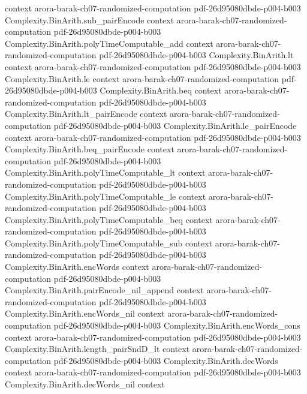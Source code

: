 \begin{theorem}
  {context}
  {arora-barak-ch07-randomized-computation}
  {pdf-26d95080dbde-p004-b003}
\proofstep
  {Complexity.BinArith.sub_pairEncode}
  {context}
  {arora-barak-ch07-randomized-computation}
  {pdf-26d95080dbde-p004-b003}
\proofstep
  {Complexity.BinArith.polyTimeComputable_add}
  {context}
  {arora-barak-ch07-randomized-computation}
  {pdf-26d95080dbde-p004-b003}
\proofstep
  {Complexity.BinArith.lt}
  {context}
  {arora-barak-ch07-randomized-computation}
  {pdf-26d95080dbde-p004-b003}
\proofstep
  {Complexity.BinArith.le}
  {context}
  {arora-barak-ch07-randomized-computation}
  {pdf-26d95080dbde-p004-b003}
\proofstep
  {Complexity.BinArith.beq}
  {context}
  {arora-barak-ch07-randomized-computation}
  {pdf-26d95080dbde-p004-b003}
\proofstep
  {Complexity.BinArith.lt_pairEncode}
  {context}
  {arora-barak-ch07-randomized-computation}
  {pdf-26d95080dbde-p004-b003}
\proofstep
  {Complexity.BinArith.le_pairEncode}
  {context}
  {arora-barak-ch07-randomized-computation}
  {pdf-26d95080dbde-p004-b003}
\proofstep
  {Complexity.BinArith.beq_pairEncode}
  {context}
  {arora-barak-ch07-randomized-computation}
  {pdf-26d95080dbde-p004-b003}
\proofstep
  {Complexity.BinArith.polyTimeComputable_lt}
  {context}
  {arora-barak-ch07-randomized-computation}
  {pdf-26d95080dbde-p004-b003}
\proofstep
  {Complexity.BinArith.polyTimeComputable_le}
  {context}
  {arora-barak-ch07-randomized-computation}
  {pdf-26d95080dbde-p004-b003}
\proofstep
  {Complexity.BinArith.polyTimeComputable_beq}
  {context}
  {arora-barak-ch07-randomized-computation}
  {pdf-26d95080dbde-p004-b003}
\proofstep
  {Complexity.BinArith.polyTimeComputable_sub}
  {context}
  {arora-barak-ch07-randomized-computation}
  {pdf-26d95080dbde-p004-b003}
\proofstep
  {Complexity.BinArith.encWords}
  {context}
  {arora-barak-ch07-randomized-computation}
  {pdf-26d95080dbde-p004-b003}
\proofstep
  {Complexity.BinArith.pairEncode_nil_append}
  {context}
  {arora-barak-ch07-randomized-computation}
  {pdf-26d95080dbde-p004-b003}
\proofstep
  {Complexity.BinArith.encWords_nil}
  {context}
  {arora-barak-ch07-randomized-computation}
  {pdf-26d95080dbde-p004-b003}
\proofstep
  {Complexity.BinArith.encWords_cons}
  {context}
  {arora-barak-ch07-randomized-computation}
  {pdf-26d95080dbde-p004-b003}
\proofstep
  {Complexity.BinArith.length_pairSndD_lt}
  {context}
  {arora-barak-ch07-randomized-computation}
  {pdf-26d95080dbde-p004-b003}
\proofstep
  {Complexity.BinArith.decWords}
  {context}
  {arora-barak-ch07-randomized-computation}
  {pdf-26d95080dbde-p004-b003}
\proofstep
  {Complexity.BinArith.decWords_nil}
  {context}

\end{theorem}
